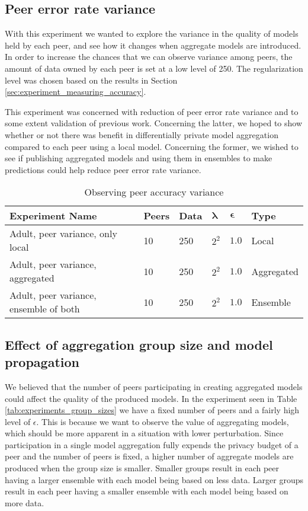 \subsection{Peer error rate variance}
\label{sec:experiment_peer_variance}
With this experiment we wanted to explore the variance in the quality of models held by each peer, and see how it changes when aggregate models are introduced. In order to increase the chances that we can observe variance among peers, the amount of data owned by each peer is set at a low level of 250. The regularization level was chosen based on the results in Section \ref{sec:experiment_measuring_accuracy}.

This experiment was concerned with reduction of peer error rate variance and to some extent validation of previous work. Concerning the latter, we hoped to show whether or not there was benefit in differentially private model aggregation compared to each peer using a local model. Concerning the former, we wished to see if publishing aggregated models and using them in ensembles to make predictions could help reduce peer error rate variance.
 
\begin{table}[h]
	\centering
	\begin{tabular}{|l|l|l|l|l|l|}
		{\bf Experiment 	Name}                  & {\bf Peers} & {\bf Data} & $\boldsymbol{\lambda}$ & $\boldsymbol{\epsilon}$ & {\bf Type} \\
		\hline
		Adult, peer variance, only local       & 10          & 250        & $2^{2}$   & $1.0$      & Local      \\
		Adult, peer variance, aggregated       & 10          & 250        & $2^{2}$   & $1.0$      & Aggregated \\
		Adult, peer variance, ensemble of both & 10          & 250        & $2^{2}$   & $1.0$      & Ensemble  
	\end{tabular}
	\caption{Observing peer accuracy variance}
	\label{tab:experiments_peer_variance}
\end{table}

\subsection{Effect of aggregation group size and model propagation}

We believed that the number of peers participating in creating aggregated models could affect the quality of the produced models. In the experiment seen in Table \ref{tab:experiments_group_sizes} we have a fixed number of peers and a fairly high level of $\epsilon$. This is because we want to observe the value of aggregating models, which should be more apparent in a situation with lower perturbation. Since participation in a single model aggregation fully expends the privacy budget of a peer and the number of peers is fixed, a higher number of aggregate models are produced when the group size is smaller. Smaller groups result in each peer having a larger ensemble with each model being based on less data. Larger groups result in each peer having a smaller ensemble with each model being based on more data.

